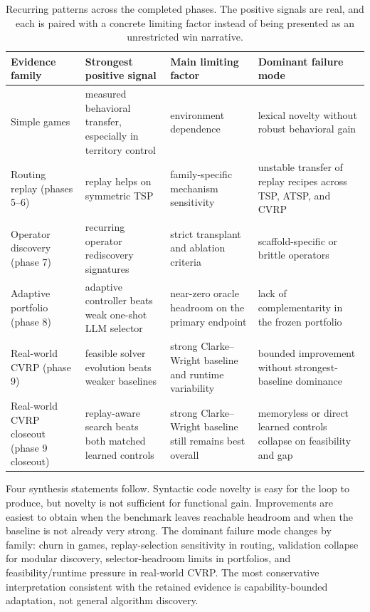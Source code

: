 \begin{table}[t]
\centering
\scriptsize
\setlength{\tabcolsep}{2pt}
\begin{tabularx}{\textwidth}{
  >{\raggedright\arraybackslash}p{0.95in}
  Y
  Y
  Y
}
\toprule
Evidence family & Strongest positive signal & Main limiting factor & Dominant failure mode \\
\midrule
Simple games & measured behavioral transfer, especially in territory control & environment dependence & lexical novelty without robust behavioral gain \\
Routing replay (phases 5--6) & replay helps on symmetric TSP & family-specific mechanism sensitivity & unstable transfer of replay recipes across TSP, ATSP, and CVRP \\
Operator discovery (phase 7) & recurring operator rediscovery signatures & strict transplant and ablation criteria & scaffold-specific or brittle operators \\
Adaptive portfolio (phase 8) & adaptive controller beats weak one-shot LLM selector & near-zero oracle headroom on the primary endpoint & lack of complementarity in the frozen portfolio \\
Real-world CVRP (phase 9) & feasible solver evolution beats weaker baselines & strong Clarke--Wright baseline and runtime variability & bounded improvement without strongest-baseline dominance \\
Real-world CVRP closeout (phase 9 closeout) & replay-aware search beats both matched learned controls & strong Clarke--Wright baseline still remains best overall & memoryless or direct learned controls collapse on feasibility and gap \\
\bottomrule
\end{tabularx}
\caption[Recurring cross-family patterns]{Recurring patterns across the completed phases. The positive signals are real, and each is
paired with a concrete limiting factor instead of being presented as an unrestricted win narrative.}
\label{tab:conclusion-patterns}
\end{table}

Four synthesis statements follow. Syntactic code novelty is easy for the loop to produce, but
novelty is not sufficient for functional gain. Improvements are easiest to obtain when the
benchmark leaves reachable headroom and when the baseline is not already very strong. The dominant
failure mode changes by family: churn in games, replay-selection sensitivity in routing,
validation collapse for modular discovery, selector-headroom limits in portfolios, and
feasibility/runtime pressure in real-world CVRP. The most conservative interpretation consistent
with the retained evidence is capability-bounded adaptation, not general algorithm
discovery.

